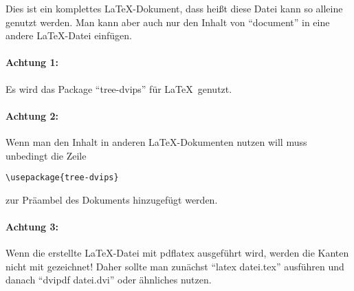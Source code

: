 Dies ist ein komplettes \LaTeX-Dokument, dass heißt diese Datei kann so alleine genutzt werden. Man kann aber auch nur den Inhalt von "`document"' in eine andere \LaTeX-Datei einfügen.

\paragraph*{Achtung 1:} Es wird das Package "`tree-dvips"' für \LaTeX\ genutzt.

\paragraph*{Achtung 2:} Wenn man den Inhalt in anderen \LaTeX-Dokumenten nutzen will muss unbedingt die Zeile
\begin{verbatim}
\usepackage{tree-dvips}
\end{verbatim}
zur Präambel des Dokuments hinzugefügt werden.

\paragraph*{Achtung 3:} Wenn die erstellte \LaTeX-Datei mit pdflatex ausgeführt wird, werden die Kanten nicht mit gezeichnet! Daher sollte man zunächst "`latex datei.tex"' ausführen und danach "`dvipdf datei.dvi"' oder ähnliches nutzen.
